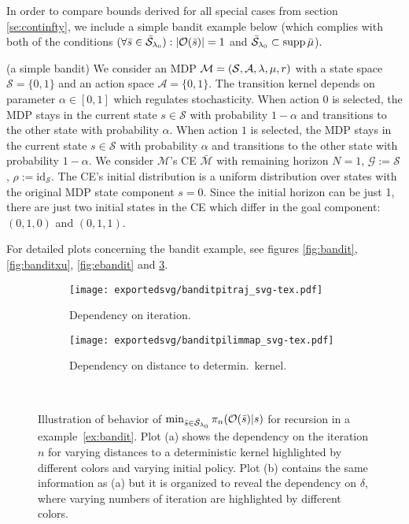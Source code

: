 In order to compare bounds derived for all special cases from section
\ref{se:continfty}, we include a simple bandit example below (which
complies with both of the conditions $(\forall \bar{s}\in \bar{\mathcal{S}}_{\mathit{\lambda}_0}): |\mathcal{O}(\bar{s})|=1$ and $\bar{\mathcal{S}}_{\mathit{\lambda}_0} \subset \operatorname*{\mathrm{supp}} \bar{\mu}$).
\begin{example}\label{ex:bandit} (a simple bandit)
We consider an MDP $\mathcal{M} = (\mathcal{S},\mathcal{A},\mathit{\lambda},\mu,r)$ with a state space $\mathcal{S} = \{0,1\}$ and an action space $\mathcal{A}=\{0,1\}$.
The transition kernel depends on parameter $\alpha \in [0,1]$ which regulates
stochasticity.
When action $0$ is selected, the MDP stays in the current state $s\in\mathcal{S}$ with probability $1-\alpha$ and transitions to the other state with probability $\alpha$.
When action $1$ is selected, the MDP stays in the current state $s \in \mathcal{S}$ with probability $\alpha$ and transitions to the other state with probability $1-\alpha$.
We consider $\mathcal{M}$'s CE $\bar{\mathcal{M}}$ with remaining horizon $N=1$,
$\mathcal{G}:=\mathcal{S}$, $\rho :=\mathrm{id}_{\mathcal{S}}$.
The CE's initial distribution is a uniform distribution over states with the original MDP state component $s=0$. Since the initial horizon can be just 1, there are just two initial states in the CE which differ in the goal component: $(0,1,0)$ and $(0,1,1)$.
\end{example}
For detailed plots concerning the bandit example, see figures \ref{fig:bandit}, \ref{fig:banditxu}, \ref{fig:ebandit} and \ref{fig:banditap}.
\begin{figure}
    \begin{subfigure}{0.48\linewidth}
		\texttt{[image: exportedsvg/banditpitraj\_svg-tex.pdf]}
		\caption{Dependency on iteration.}
        \label{fig:banditap:a}
	\end{subfigure}
     \begin{subfigure}{0.48\linewidth}
		\texttt{[image: exportedsvg/banditpilimmap\_svg-tex.pdf]}
		\caption{Dependency on distance to determin.~kernel.}
        \label{fig:banditap:b}
	\end{subfigure}\\    
    \caption{Illustration of behavior of $\min_{\bar{s}\in\bar{\mathcal{S}}_{\mathit{\lambda}_0}}\pi_n(\mathcal{O}(\bar{s})|s)$ for \eUDRL{} recursion in a example~\ref{ex:bandit}. 
    Plot (a) shows the dependency on the iteration $n$ for varying distances to a deterministic kernel highlighted by different colors and varying initial policy. Plot (b) contains the same information as (a) but it is organized to reveal the dependency on $\delta$, where varying numbers of iteration are highlighted by different colors.}
    \label{fig:banditap}
\end{figure}

